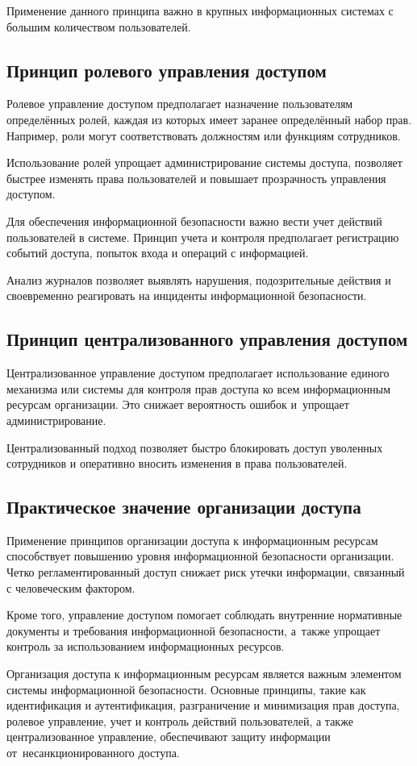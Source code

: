 \documentclass{ou}
\begin{document}
Применение данного принципа важно в крупных информационных 
системах с большим количеством пользователей. 
\subsection{Принцип ролевого управления доступом}
Ролевое управление доступом предполагает назначение пользователям 
определённых ролей, каждая из которых имеет заранее определённый набор 
прав. Например, роли могут соответствовать должностям или функциям 
сотрудников. 

Использование ролей упрощает администрирование системы доступа, позволяет 
быстрее изменять права пользователей и повышает прозрачность управления 
доступом. 

Для обеспечения информационной безопасности важно вести учет действий 
пользователей в системе. Принцип учета и контроля предполагает регистрацию 
событий доступа, попыток входа и операций с информацией. 

Анализ журналов позволяет выявлять нарушения, подозрительные действия и 
своевременно реагировать на инциденты информационной безопасности. 
\subsection{Принцип централизованного управления доступом}
Централизованное управление доступом предполагает использование единого 
механизма или системы для контроля прав доступа ко всем информационным 
ресурсам организации. Это снижает вероятность ошибок и~упрощает 
администрирование. 

Централизованный подход позволяет быстро блокировать доступ уволенных 
сотрудников и оперативно вносить изменения в права пользователей. 
\subsection{Практическое значение организации доступа} 
Применение принципов организации доступа к информационным ресурсам 
способствует повышению уровня информационной безопасности организации. 
Четко регламентированный доступ снижает риск утечки информации, связанный 
с человеческим фактором. 

Кроме того, управление доступом помогает соблюдать внутренние нормативные 
документы и требования информационной безопасности, а~также упрощает 
контроль за использованием информационных ресурсов. 

Организация доступа к информационным ресурсам является важным элементом 
системы информационной безопасности. Основные принципы, такие как 
идентификация и аутентификация, разграничение и минимизация прав доступа, 
ролевое управление, учет и контроль действий пользователей, а также 
централизованное управление, обеспечивают защиту информации от~несанкционированного доступа. 
\end{document}
